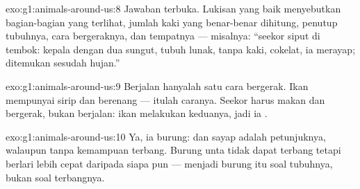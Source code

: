 \begin{solution}{exo:g1:animals-around-us:8}
Jawaban terbuka. Lukisan yang baik menyebutkan bagian-bagian yang
terlihat, jumlah kaki yang benar-benar dihitung, penutup tubuhnya,
cara bergeraknya, dan tempatnya --- misalnya: ``seekor siput di
tembok: kepala dengan dua sungut, tubuh lunak, tanpa kaki, 
cokelat, ia merayap; ditemukan sesudah hujan.''
\end{solution}

\begin{solution}{exo:g1:animals-around-us:9}
Berjalan hanyalah satu cara bergerak. Ikan mempunyai sirip dan
berenang --- itulah caranya. Seekor  harus makan dan bergerak,
bukan berjalan: ikan melakukan keduanya, jadi ia .
\end{solution}

\begin{solution}{exo:g1:animals-around-us:10}
Ya, ia burung:  dan sayap adalah petunjuknya, walaupun
tanpa kemampuan terbang. Burung unta tidak dapat terbang tetapi
berlari lebih cepat daripada siapa pun --- menjadi burung itu soal
tubuhnya, bukan soal terbangnya.
\end{solution}
